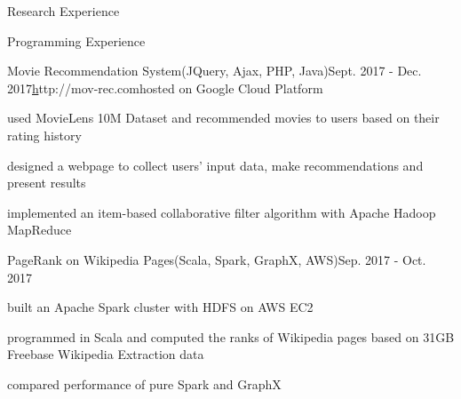 \documentclass{resume} %
\begin{document}
\begin{rSection}{Research Experience}

\end{rSection}

\begin{rSection}{Programming Experience}

\begin{rSubsection}{Movie Recommendation System(JQuery, Ajax, PHP, Java)}{Sept. 2017 - Dec. 2017}{\href{http://mov-rec.com}http://mov-rec.com}{hosted on Google Cloud Platform}
\item used MovieLens 10M Dataset and recommended movies to users based on their rating history
\item designed a webpage to collect users' input data, make recommendations and present results
\item implemented an item-based collaborative filter algorithm with Apache Hadoop MapReduce
\end{rSubsection}

\begin{rSubsection}{PageRank on Wikipedia Pages(Scala, Spark, GraphX, AWS)}{Sep. 2017 - Oct. 2017}{}{}
\item built an Apache Spark cluster with HDFS on AWS EC2
\item programmed in Scala and computed the ranks of Wikipedia pages based on 31GB Freebase Wikipedia Extraction data
\item compared performance of pure Spark and GraphX
\end{rSubsection}



\end{rSection}
\end{document}
